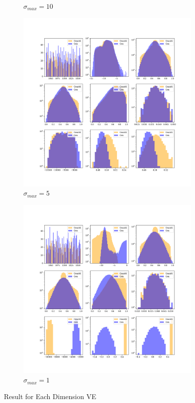 \begin{figure}
\begin{subfigure}[b]{0.23\textwidth}
        \caption{$\sigma_{max}=10$}
        \label{fig:ve10_1}
    \end{subfigure}
    \hfill
    \begin{subfigure}[b]{0.23\textwidth}
        \centering
        \includegraphics[width=\textwidth]{Figures/ve5_1.png}
        \caption{$\sigma_{max}=5$}
        \label{fig:ve5_1}
    \end{subfigure}
    \hfill
    \begin{subfigure}[b]{0.23\textwidth}  %
        \centering
        \includegraphics[width=\textwidth]{Figures/ve1_1.png}
        \caption{$\sigma_{max}=1$}
        \label{fig:ve1_1}
    \end{subfigure}
    \caption{Result for Each Dimension VE}
\end{figure}

